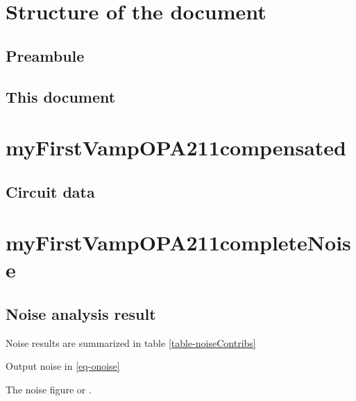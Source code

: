 \documentclass[a4paper, 10pt]{article}%
\begin{document}
\section{Structure of the document}
\subsection{Preambule}

\subsection{This document}

\section{myFirstVampOPA211compensated}

\subsection{Circuit data}






 




\newpage
\section{myFirstVampOPA211completeNoise} 

\subsection{Noise analysis result} 

Noise results are summarized in table \ref{table-noiseContribs} 



Output noise in \ref{eq-onoise}

 

The noise figure  or .
 
\end{document}
